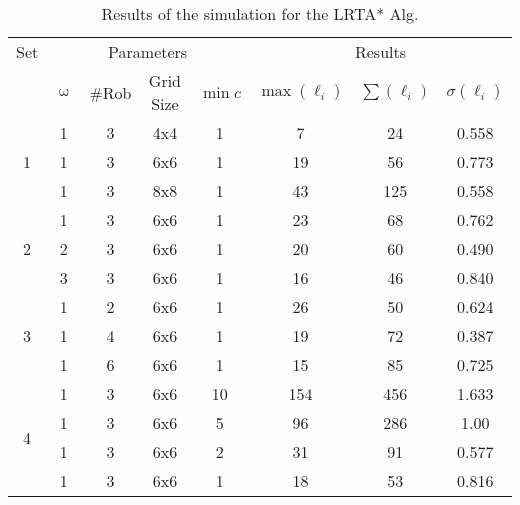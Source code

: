 \begin{table}[H]
\centering
\begin{tabular}{@{}cccccccc@{}}
\toprule
Set                & \multicolumn{4}{c}{Parameters}  & \multicolumn{3}{c}{Results}              \\ \cmidrule(lr){2-5} \cmidrule(lr){6-8}
                   & $\upomega$ & \#Rob & Grid Size & $\min c$ & $\max(\ell_i)$ & $\sum(\ell_i)$ & $\sigma(\ell_i)$ \\ \midrule
\multirow{3}{*}{1} & 1           & 3     & 4x4       &   1     &  7        &  24        &   0.558   \\
                             & 1           & 3     & 6x6       &   1     &   19      &  56       &   0.773    \\
                             & 1           & 3     & 8x8       &   1     &   43      &  125     &   0.558    \\ \midrule
\multirow{3}{*}{2} & 1           & 3     & 6x6       &   1     &   23      &  68       &  0.762     \\
                             & 2           & 3     & 6x6       &   1     &   20      &  60       &  0.490     \\
                             & 3           & 3     & 6x6       &   1     &   16      &  46       &  0.840     \\ \midrule
\multirow{3}{*}{3} & 1           & 2     & 6x6       &   1     &   26      &  50        & 0.624       \\
                             & 1           & 4     & 6x6       &   1     &   19      &  72       &  0.387      \\
                             & 1           & 6     & 6x6       &   1     &   15     &   85      &   0.725     \\ \midrule
\multirow{4}{*}{4} & 1           & 3     & 6x6       &   10   &  154    &  456      &   1.633         \\
                             & 1           & 3     & 6x6       &   5     &   96     &  286      &   1.00       \\
                             & 1           & 3     & 6x6       &   2     &   31     &   91      &  0.577        \\
                             & 1           & 3     & 6x6       &   1    &    18      &  53      &  0.816  \\ \bottomrule
\end{tabular}
\caption{Results of the simulation for the LRTA* Alg.}
\label{tab:LRTA_results}
\end{table}

